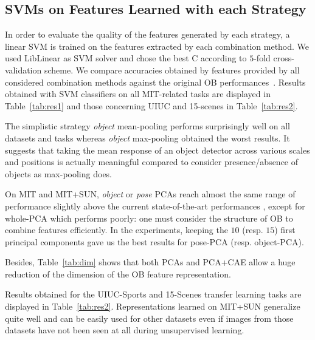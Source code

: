 \documentclass[runningheads,a4paper]{llncs}
\begin{document}
\subsection{SVMs on Features Learned with each Strategy} 

In order to evaluate the quality of the features generated by each
strategy, a linear SVM is trained on the features extracted 
by each combination method.
%
We used LibLinear \cite{liblinear} as SVM solver and chose the best C
according to $5$-fold cross-validation scheme.
%
We compare accuracies obtained by features provided by all considered
combination methods against the original OB performances~\cite{LiJiaLi10}. 
%
Results obtained with SVM classifiers on all MIT-related tasks are
displayed in Table~\ref{tab:res1} and those concerning UIUC and
15-scenes in Table~\ref{tab:res2}.

%
The simplistic strategy \textit{object} mean-pooling performs surprisingly well
on all datasets and tasks whereas \textit{object} max-pooling obtained the
worst results.  It suggests that taking the mean response of an object detector
across various scales and positions is actually meaningful compared to consider
presence/absence of objects as max-pooling does.
%
%

On MIT and MIT+SUN, \textit{object} or \textit{pose} PCAs reach almost the same
range of performance slightly above the current state-of-the-art performances
\cite{Pandey11}, except for whole-PCA which performs poorly: one must consider
the structure of OB to combine features efficiently. In the experiments,
keeping the $10$ (resp. $15$) first principal components gave us the best
results for pose-PCA (resp. object-PCA).

%
Besides, Table~\ref{tab:dim} shows that both PCAs and PCA+CAE allow a huge
reduction of the dimension of the OB feature representation.
%

Results obtained for the UIUC-Sports and 15-Scenes transfer learning tasks are
displayed in Table~\ref{tab:res2}. Representations learned on MIT+SUN
generalize quite well and can be easily used for other datasets even if images
from those datasets  have not been seen at all during unsupervised learning.
\end{document}
